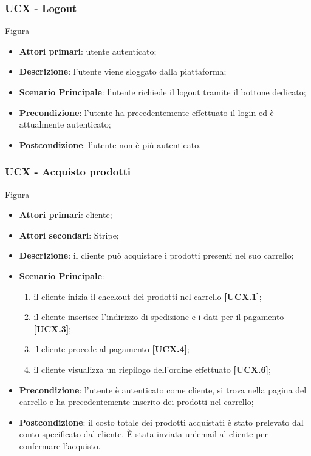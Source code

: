 \subsubsection{UCX - Logout}
Figura \\
\begin{itemize}
\item \textbf{Attori primari}: utente autenticato;
\item \textbf{Descrizione}: l'utente viene sloggato dalla piattaforma;
\item \textbf{Scenario Principale}: l'utente richiede il logout tramite il bottone dedicato;
\item \textbf{Precondizione}: l'utente ha precedentemente effettuato il login ed è attualmente autenticato;
\item \textbf{Postcondizione}: l'utente non è più autenticato.
\end{itemize}

\subsubsection{UCX - Acquisto prodotti}
Figura \\
\begin{itemize}
\item \textbf{Attori primari}: cliente;
\item \textbf{Attori secondari}: Stripe;
\item \textbf{Descrizione}: il cliente può acquistare i prodotti presenti nel suo carrello;
\item \textbf{Scenario Principale}: 
\begin{enumerate}
	\item il cliente inizia il checkout dei prodotti nel carrello \textbf{[UCX.1]};
	\item il cliente inserisce l'indirizzo di spedizione e i dati per il pagamento \textbf{[UCX.3]};
	\item il cliente procede al pagamento \textbf{[UCX.4]};
	\item il cliente visualizza un riepilogo dell'ordine effettuato \textbf{[UCX.6]};
\end{enumerate}
\item \textbf{Precondizione}: l'utente è autenticato come cliente, si trova nella pagina del carrello e ha precedentemente inserito dei prodotti nel carrello;
\item \textbf{Postcondizione}: il costo totale dei prodotti acquistati è stato prelevato dal conto specificato dal cliente. È stata inviata un'email al cliente per confermare l'acquisto.
\end{itemize}

